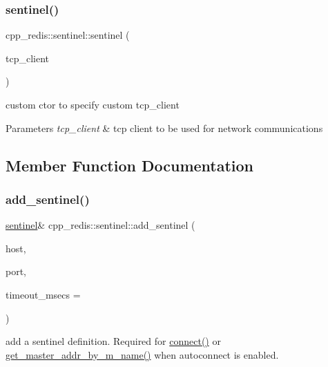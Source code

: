 \subsubsection{\texorpdfstring{sentinel()}{sentinel()}\hspace{0.1cm}{\footnotesize\ttfamily [2/2]}}
{\footnotesize\ttfamily cpp\+\_\+redis\+::sentinel\+::sentinel (\begin{DoxyParamCaption}\item[{const std\+::shared\+\_\+ptr$<$ \mbox{\hyperlink{classcpp__redis_1_1network_1_1tcp__client__iface}{network\+::tcp\+\_\+client\+\_\+iface}} $>$ \&}]{tcp\+\_\+client }\end{DoxyParamCaption})\hspace{0.3cm}{\ttfamily [explicit]}}

custom ctor to specify custom tcp\+\_\+client


\begin{DoxyParams}{Parameters}
{\em tcp\+\_\+client} & tcp client to be used for network communications \\
\hline
\end{DoxyParams}


\subsection{Member Function Documentation}
\mbox{\label{classcpp__redis_1_1sentinel_a6c846b71478c330d2cad7aa662dfd681}} 
\subsubsection{\texorpdfstring{add\+\_\+sentinel()}{add\_sentinel()}}
{\footnotesize\ttfamily \mbox{\hyperlink{classcpp__redis_1_1sentinel}{sentinel}}\& cpp\+\_\+redis\+::sentinel\+::add\+\_\+sentinel (\begin{DoxyParamCaption}\item[{const std\+::string \&}]{host,  }\item[{std\+::size\+\_\+t}]{port,  }\item[{std\+::uint32\+\_\+t}]{timeout\+\_\+msecs = {} }\end{DoxyParamCaption})}

add a sentinel definition. Required for \mbox{\hyperlink{classcpp__redis_1_1sentinel_a1dfba8240daf7cfa7502f57957cffbda}{connect()}} or \mbox{\hyperlink{classcpp__redis_1_1sentinel_a2886493b40b00dfafdd3b22dfe28e0c3}{get\+\_\+master\+\_\+addr\+\_\+by\+\_\+m_name()}} when autoconnect is enabled.


